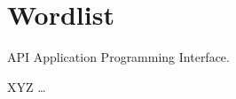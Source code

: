\chapter*{Wordlist}
\begin{basedescript}{\desclabelstyle{\pushlabel}\desclabelwidth{8em}}
	\item[API] Application Programming Interface.
	\item[XYZ] …
\end{basedescript}
